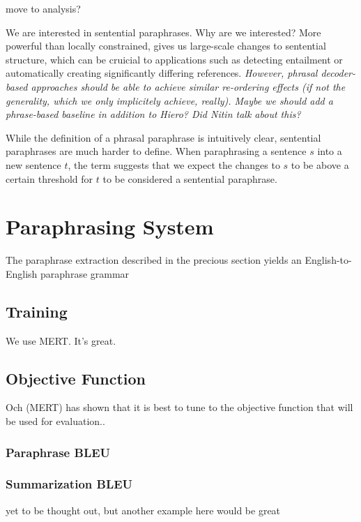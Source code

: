 \documentclass[11pt]{article}
\begin{document}
move to analysis?

We are interested in sentential paraphrases. Why are we interested?
More powerful than locally constrained, gives us large-scale changes
to sentential structure, which can be cruicial to applications such as
detecting entailment or automatically creating significantly differing
references. \emph{However, phrasal decoder-based approaches should be
  able to achieve similar re-ordering effects (if not the generality,
  which we only implicitely achieve, really). Maybe we should add a
  phrase-based baseline in addition to Hiero? Did Nitin talk about
  this?}

While the definition of a phrasal paraphrase is intuitively clear,
sentential paraphrases are much harder to define. When paraphrasing a
sentence $s$ into a new sentence $t$, the term suggests that we expect
the changes to $s$ to be above a certain threshold for $t$ to be
considered a sentential paraphrase. 

\section{Paraphrasing System} \label{approach}

The paraphrase extraction described in the precious section yields an
English-to-English paraphrase grammar

\subsection{Training}

We use MERT. It's great.

\subsection{Objective Function} \label{features}

Och (MERT) has shown that it is best to tune to the objective function
that will be used for evaluation..

\subsubsection{Paraphrase BLEU}

\subsubsection{Summarization BLEU}
yet to be thought out, but another example here
would be great
\end{document}
